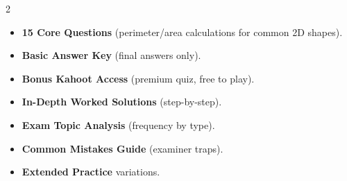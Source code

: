\documentclass[11pt,a4paper]{article}
\newcommand{\FullReleaseDate}{April 30, 2026}
\begin{document}
\vspace{8pt}

\begin{multicols}{2}
  \begin{tcolorbox}[card, title=\sffamily\bfseries\textcolor{white}{\faHandPointDown\ TODAY (Simplified Version)}, colbacktitle=mainblue, boxed title style={sharp corners, boxrule=0pt}]
    \begin{itemize}[leftmargin=1.2em, itemsep=2pt]
      \item \small \textbf{15 Core Questions} (perimeter/area calculations for common 2D shapes).
      \item \small \textbf{Basic Answer Key} (final answers only).
      \item \small \textbf{Bonus Kahoot Access} (premium quiz, free to play).
    \end{itemize}
  \end{tcolorbox}

  \columnbreak

  \begin{tcolorbox}[card, title=\sffamily\bfseries\textcolor{white}{\faRocket\ ON \FullReleaseDate\ (Full Upgrade)}, colbacktitle=mainblue, boxed title style={sharp corners, boxrule=0pt}]
    \begin{itemize}[leftmargin=1.2em, itemsep=2pt]
      \item \small \textbf{In-Depth Worked Solutions} (step-by-step).
      \item \small \textbf{Exam Topic Analysis} (frequency by type).
      \item \small \textbf{Common Mistakes Guide} (examiner traps).
      \item \small \textbf{Extended Practice} variations.
    \end{itemize}
  \end{tcolorbox}
\end{multicols}
\end{document}
